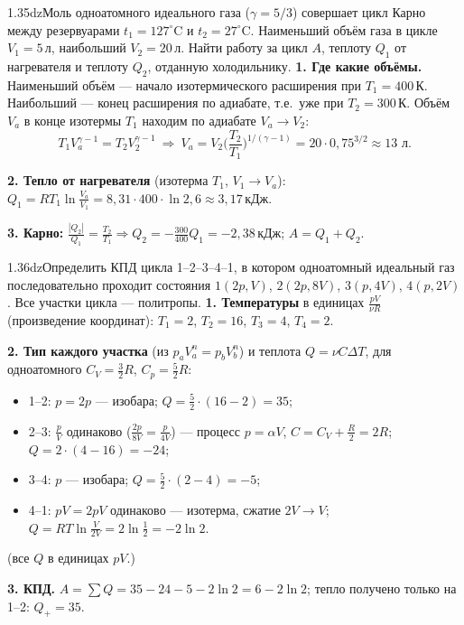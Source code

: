 \begin{problem}{1.35}{dz}{Моль одноатомного идеального газа ($\gamma=5/3$) совершает цикл Карно между резервуарами $t_1=127^\circ$C и $t_2=27^\circ$C.
Наименьший объём газа в цикле $V_1=5$\,л, наибольший $V_2=20$\,л. Найти работу за цикл $A$, теплоту $Q_1$ от нагревателя и теплоту $Q_2$, отданную холодильнику.}
\textbf{1. Где какие объёмы.} Наименьший объём — начало изотермического расширения при $T_1=400$\,К. Наибольший — конец расширения по адиабате, т.е.\ уже при $T_2=300$\,К.
Объём $V_a$ в конце изотермы $T_1$ находим по адиабате $V_a\to V_2$:
\[T_1V_a^{\gamma-1}=T_2V_2^{\gamma-1}\ \Rightarrow\ V_a=V_2\Big(\frac{T_2}{T_1}\Big)^{1/(\gamma-1)}=20\cdot0{,}75^{3/2}\approx13\text{ л}.\]

\textbf{2. Тепло от нагревателя} (изотерма $T_1$, $V_1\to V_a$):
$Q_1=RT_1\ln\frac{V_a}{V_1}=8{,}31\cdot400\cdot\ln2{,}6\approx3{,}17$\,кДж.

\textbf{3. Карно:} $\frac{|Q_2|}{Q_1}=\frac{T_2}{T_1}\Rightarrow Q_2=-\frac{300}{400}Q_1=-2{,}38$\,кДж; $A=Q_1+Q_2$.
\end{problem}

\begin{problem}{1.36}{dz}{Определить КПД цикла 1--2--3--4--1, в котором одноатомный идеальный газ последовательно проходит состояния $1(2p,V)$, $2(2p,8V)$, $3(p,4V)$, $4(p,2V)$.
Все участки цикла — политропы.}
\textbf{1. Температуры} в единицах $\frac{pV}{\nu R}$ (произведение координат): $T_1=2$, $T_2=16$, $T_3=4$, $T_4=2$.

\textbf{2. Тип каждого участка} (из $p_aV_a^n=p_bV_b^n$) и теплота $Q=\nu C\Delta T$, для одноатомного $C_V=\frac32R$, $C_p=\frac52R$:
\begin{itemize}
\item 1--2: $p=2p$ — изобара; $Q=\frac52\cdot(16-2)=35$;
\item 2--3: $\frac{p}{V}$ одинаково ($\frac{2p}{8V}=\frac{p}{4V}$) — процесс $p=\alpha V$, $C=C_V+\frac R2=2R$; $Q=2\cdot(4-16)=-24$;
\item 3--4: $p$ — изобара; $Q=\frac52\cdot(2-4)=-5$;
\item 4--1: $pV=2pV$ одинаково — изотерма, сжатие $2V\to V$; $Q=RT\ln\frac{V}{2V}=2\ln\frac12=-2\ln2$.
\end{itemize}
(все $Q$ в единицах $pV$.)

\textbf{3. КПД.} $A=\sum Q=35-24-5-2\ln2=6-2\ln2$; тепло получено только на 1--2: $Q_+=35$.
\end{problem}

